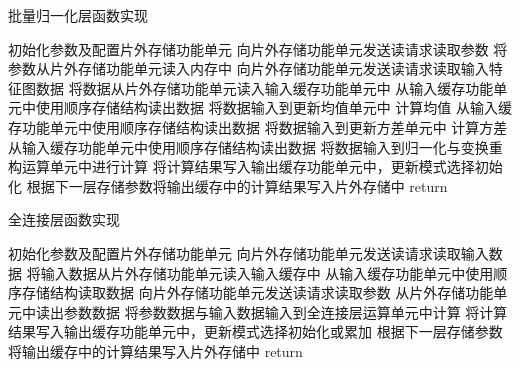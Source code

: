 \documentclass[11pt,UTF8]{ctexart}
\begin{document}
    \begin{algorithm}[H]
     \caption{批量归一化层函数实现}
        初始化参数及配置片外存储功能单元\;
        向片外存储功能单元发送读请求读取参数\;
        将参数从片外存储功能单元读入内存中\;
        {
            向片外存储功能单元发送读请求读取输入特征图数据\;
            将数据从片外存储功能单元读入输入缓存功能单元中\;
            {
                从输入缓存功能单元中使用顺序存储结构读出数据\;
                将数据输入到更新均值单元中
            }
            计算均值\;
            {
                从输入缓存功能单元中使用顺序存储结构读出数据\;
                将数据输入到更新方差单元中
            }
            计算方差\;
            {
                从输入缓存功能单元中使用顺序存储结构读出数据\;
                将数据输入到归一化与变换重构运算单元中进行计算\;
                将计算结果写入输出缓存功能单元中，更新模式选择初始化\;
            }
        }
        根据下一层存储参数将输出缓存中的计算结果写入片外存储中\;
        return\;
    \end{algorithm}


    \begin{algorithm}[H]
     \caption{全连接层函数实现}
        初始化参数及配置片外存储功能单元\;
        向片外存储功能单元发送读请求读取输入数据\;
        将输入数据从片外存储功能单元读入输入缓存中\;
        {
            从输入缓存功能单元中使用顺序存储结构读取数据\;
            向片外存储功能单元发送读请求读取参数\;
            {
                从片外存储功能单元中读出参数数据\;
                将参数数据与输入数据输入到全连接层运算单元中计算\;
                将计算结果写入输出缓存功能单元中，更新模式选择初始化或累加\;
            }
        }
        根据下一层存储参数将输出缓存中的计算结果写入片外存储中\;
        return\;
    \end{algorithm}
\end{document}
